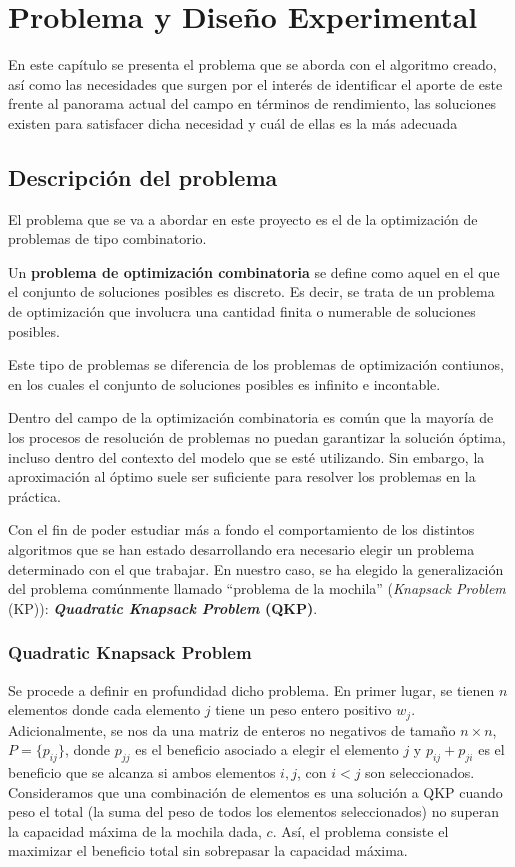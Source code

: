 \chapter{Problema y Diseño Experimental}

En este capítulo se presenta el problema que se aborda con el algoritmo creado, así como las necesidades que surgen por el interés de identificar el aporte de este frente al panorama actual del campo en términos de rendimiento, las soluciones existen para satisfacer dicha necesidad y cuál de ellas es la más adecuada

\section{Descripción del problema}

El problema que se va a abordar en este proyecto es el de la optimización de problemas de tipo combinatorio. 

\begin{definicion}
Un \textbf{problema de optimización combinatoria} se define como aquel en el que el conjunto de soluciones posibles es discreto. 
Es decir, se trata de un problema de optimización que involucra una cantidad finita o numerable de soluciones posibles.
\end{definicion}
Este tipo de problemas se diferencia de los problemas de optimización contiunos, en los cuales el conjunto de soluciones posibles es infinito e incontable. 

Dentro del campo de la optimización combinatoria es común que la mayoría de los procesos de resolución de problemas no puedan garantizar la solución óptima, incluso dentro del contexto del modelo que se esté utilizando. 
Sin embargo, la aproximación al óptimo suele ser suficiente para resolver los problemas en la práctica. 

Con el fin de poder estudiar más a fondo el comportamiento de los distintos algoritmos que se han estado desarrollando era necesario elegir un problema determinado con el que trabajar. 
En nuestro caso, se ha elegido la generalización del problema comúnmente llamado ``problema de la mochila'' (\textit{Knapsack Problem} (KP)):  \textbf{\textit{Quadratic Knapsack Problem} (QKP)}.

\subsection{Quadratic Knapsack Problem}
Se procede a definir en profundidad dicho problema. 
En primer lugar, se tienen $n$ elementos donde cada elemento $j$ tiene un peso entero positivo $w_j$. 
Adicionalmente, se nos da una matriz de enteros no negativos de tamaño $n\times n$, $P = \{p_{ij}\}$, donde $p_{jj}$ es el beneficio asociado a elegir el elemento $j$ y $p_{ij}+p_{ji}$ es el beneficio que se alcanza si ambos elementos $i,j$, con $i<j$ son seleccionados. 
Consideramos que una combinación de elementos es una solución a QKP cuando peso el total (la suma del peso de todos los elementos seleccionados) no superan la capacidad máxima de la mochila dada, $c$. 
Así, el problema consiste el maximizar el beneficio total sin sobrepasar la capacidad máxima.

